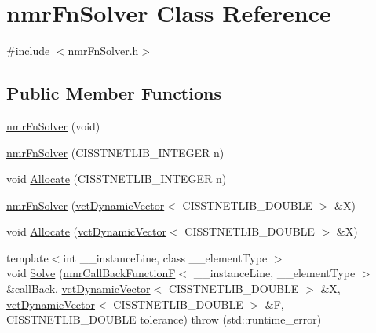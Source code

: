 \hypertarget{classnmr_fn_solver}{}\section{nmr\+Fn\+Solver Class Reference}
\label{classnmr_fn_solver}


{\ttfamily \#include $<$nmr\+Fn\+Solver.\+h$>$}

\subsection*{Public Member Functions}
\begin{DoxyCompactItemize}
\item 
\hyperlink{classnmr_fn_solver_aca0794b0654a30e4537bffa1ce54a488}{nmr\+Fn\+Solver} (void)
\item 
\hyperlink{classnmr_fn_solver_af918d360bf62e8ee3890847a1bf7060b}{nmr\+Fn\+Solver} (C\+I\+S\+S\+T\+N\+E\+T\+L\+I\+B\+\_\+\+I\+N\+T\+E\+G\+E\+R n)
\item 
void \hyperlink{classnmr_fn_solver_a81c97291fdaf4b1afa5fe04039834e31}{Allocate} (C\+I\+S\+S\+T\+N\+E\+T\+L\+I\+B\+\_\+\+I\+N\+T\+E\+G\+E\+R n)
\end{DoxyCompactItemize}
{\bf }\par
\begin{DoxyCompactItemize}
\item 
\hyperlink{classnmr_fn_solver_a4cde18dd0f3d11272a0991c75ba87407}{nmr\+Fn\+Solver} (\hyperlink{classvct_dynamic_vector}{vct\+Dynamic\+Vector}$<$ C\+I\+S\+S\+T\+N\+E\+T\+L\+I\+B\+\_\+\+D\+O\+U\+B\+L\+E $>$ \&X)
\end{DoxyCompactItemize}

{\bf }\par
\begin{DoxyCompactItemize}
\item 
void \hyperlink{classnmr_fn_solver_afef5f3c1b9b57846759ed375dca30637}{Allocate} (\hyperlink{classvct_dynamic_vector}{vct\+Dynamic\+Vector}$<$ C\+I\+S\+S\+T\+N\+E\+T\+L\+I\+B\+\_\+\+D\+O\+U\+B\+L\+E $>$ \&X)
\end{DoxyCompactItemize}

{\bf }\par
\begin{DoxyCompactItemize}
\item 
{\footnotesize template$<$int \+\_\+\+\_\+instance\+Line, class \+\_\+\+\_\+element\+Type $>$ }\\void \hyperlink{classnmr_fn_solver_aa11bd4b3ac560b2be8fa8c6ec1fd1f99}{Solve} (\hyperlink{classnmr_call_back_function_f}{nmr\+Call\+Back\+Function\+F}$<$ \+\_\+\+\_\+instance\+Line, \+\_\+\+\_\+element\+Type $>$ \&call\+Back, \hyperlink{classvct_dynamic_vector}{vct\+Dynamic\+Vector}$<$ C\+I\+S\+S\+T\+N\+E\+T\+L\+I\+B\+\_\+\+D\+O\+U\+B\+L\+E $>$ \&X, \hyperlink{classvct_dynamic_vector}{vct\+Dynamic\+Vector}$<$ C\+I\+S\+S\+T\+N\+E\+T\+L\+I\+B\+\_\+\+D\+O\+U\+B\+L\+E $>$ \&F, C\+I\+S\+S\+T\+N\+E\+T\+L\+I\+B\+\_\+\+D\+O\+U\+B\+L\+E tolerance)  throw (std\+::runtime\+\_\+error)
\end{DoxyCompactItemize}

